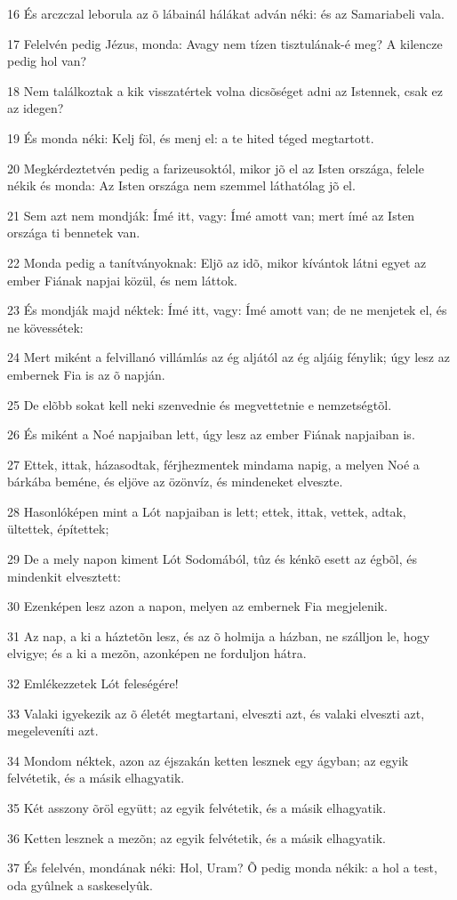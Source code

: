 \par 16 És arczczal leborula az õ lábainál hálákat adván néki: és az Samariabeli vala.
\par 17 Felelvén pedig Jézus, monda: Avagy nem tízen tisztulának-é meg? A kilencze pedig hol van?
\par 18 Nem találkoztak a kik visszatértek volna dicsõséget adni az Istennek, csak ez az idegen?
\par 19 És monda néki: Kelj föl, és menj el: a te hited téged megtartott.
\par 20 Megkérdeztetvén pedig a farizeusoktól, mikor jõ el az Isten országa, felele nékik és monda: Az Isten országa nem szemmel láthatólag jõ el.
\par 21 Sem azt nem mondják: Ímé itt, vagy: Ímé amott van; mert ímé az Isten országa ti bennetek van.
\par 22 Monda pedig a tanítványoknak: Eljõ az idõ, mikor kívántok látni egyet az ember Fiának napjai közül, és nem láttok.
\par 23 És mondják majd néktek: Ímé itt, vagy: Ímé amott van; de ne menjetek el, és ne kövessétek:
\par 24 Mert miként a felvillanó villámlás az ég aljától az ég aljáig fénylik; úgy lesz az embernek Fia is az õ napján.
\par 25 De elõbb sokat kell neki szenvednie és megvettetnie e nemzetségtõl.
\par 26 És miként a Noé napjaiban lett, úgy lesz az ember Fiának napjaiban is.
\par 27 Ettek, ittak, házasodtak, férjhezmentek mindama napig, a melyen Noé a bárkába beméne, és eljöve az özönvíz, és mindeneket elveszte.
\par 28 Hasonlóképen mint a Lót napjaiban is lett; ettek, ittak, vettek, adtak, ültettek, építettek;
\par 29 De a mely napon kiment Lót Sodomából, tûz és kénkõ esett az égbõl, és mindenkit elvesztett:
\par 30 Ezenképen lesz azon a napon, melyen az embernek Fia megjelenik.
\par 31 Az nap, a ki a háztetõn lesz, és az õ holmija a házban, ne szálljon le, hogy elvigye; és a ki a mezõn, azonképen ne forduljon hátra.
\par 32 Emlékezzetek Lót feleségére!
\par 33 Valaki igyekezik az õ életét megtartani, elveszti azt, és valaki elveszti azt, megeleveníti azt.
\par 34 Mondom néktek, azon az éjszakán ketten lesznek egy ágyban; az egyik felvétetik, és a másik elhagyatik.
\par 35 Két asszony õröl együtt; az egyik felvétetik, és a másik elhagyatik.
\par 36 Ketten lesznek a mezõn; az egyik felvétetik, és a másik elhagyatik.
\par 37 És felelvén, mondának néki: Hol, Uram? Õ pedig monda nékik: a hol a test, oda gyûlnek a saskeselyûk.


